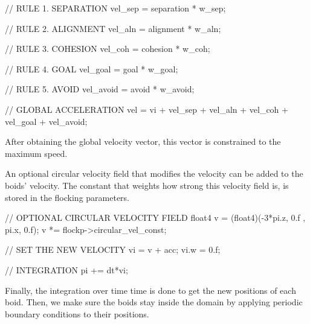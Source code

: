\begin{cppcode}{0}
// RULE 1. SEPARATION
vel_sep = separation * w_sep;
   
// RULE 2. ALIGNMENT
vel_aln = alignment * w_aln;

// RULE 3. COHESION
vel_coh = cohesion * w_coh;

// RULE 4. GOAL
vel_goal = goal * w_goal;

// RULE 5. AVOID
vel_avoid = avoid * w_avoid;

// GLOBAL ACCELERATION
vel = vi + vel_sep + vel_aln + vel_coh + vel_goal + vel_avoid;
\end{cppcode}

After obtaining the global velocity vector, this vector is constrained to the maximum speed. 

An optional circular velocity field that modifies the velocity can be added to the boids' velocity. The constant that weights how strong this velocity field is, is stored in the flocking parameters.

\begin{cppcode}{0}
// OPTIONAL CIRCULAR VELOCITY FIELD
float4 v = (float4)(-3*pi.z, 0.f , pi.x, 0.f);
v *= flockp->circular_vel_const;

// SET THE NEW VELOCITY
vi = v + acc;
vi.w = 0.f;

// INTEGRATION
pi += dt*vi; 
\end{cppcode}

Finally, the integration over time time is done to get the new positions of each boid. Then, we make sure the boids stay inside the domain by applying periodic boundary conditions to their positions. 


